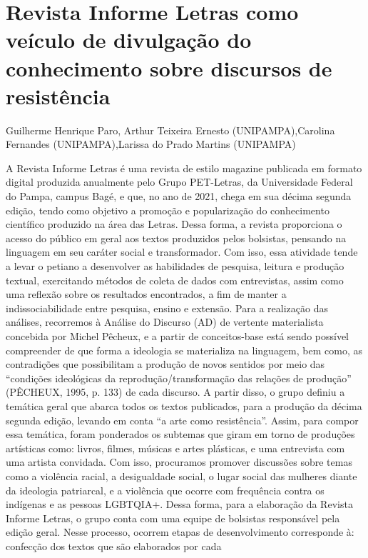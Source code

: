 

\section{Revista Informe Letras como veículo de divulgação do conhecimento sobre discursos de resistência}

Guilherme Henrique Paro, Arthur Teixeira Ernesto (UNIPAMPA),Carolina Fernandes (UNIPAMPA),Larissa do Prado Martins (UNIPAMPA)

A Revista Informe Letras é uma revista de estilo magazine publicada em formato digital
produzida anualmente pelo Grupo PET-Letras, da Universidade Federal do Pampa, campus
Bagé, e que, no ano de 2021, chega em sua décima segunda edição, tendo como objetivo a
promoção e popularização do conhecimento científico produzido na área das Letras. Dessa
forma, a revista proporciona o acesso do público em geral aos textos produzidos pelos bolsistas,
pensando na linguagem em seu caráter social e transformador. Com isso, essa atividade tende a
levar o petiano a desenvolver as habilidades de pesquisa, leitura e produção textual, exercitando
métodos de coleta de dados com entrevistas, assim como uma reflexão sobre os resultados
encontrados, a fim de manter a indissociabilidade entre pesquisa, ensino e extensão. Para a
realização das análises, recorremos à Análise do Discurso (AD) de vertente materialista
concebida por Michel Pêcheux, e a partir de conceitos-base está sendo possível compreender de
que forma a ideologia se materializa na linguagem, bem como, as contradições que possibilitam
a produção de novos sentidos por meio das “condições ideológicas da reprodução/transformação
das relações de produção” (PÊCHEUX, 1995, p. 133) de cada discurso. A partir disso, o grupo
definiu a temática geral que abarca todos os textos publicados, para a produção da décima
segunda edição, levando em conta “a arte como resistência”. Assim, para compor essa temática,
foram ponderados os subtemas que giram em torno de produções artísticas como: livros, filmes,
músicas e artes plásticas, e uma entrevista com uma artista convidada. Com isso, procuramos
promover discussões sobre temas como a violência racial, a desigualdade social, o lugar social
das mulheres diante da ideologia patriarcal, e a violência que ocorre com frequência contra os
indígenas e as pessoas LGBTQIA+. Dessa forma, para a elaboração da Revista Informe Letras, o
grupo conta com uma equipe de bolsistas responsável pela edição geral. Nesse processo, ocorrem
etapas de desenvolvimento corresponde à: confecção dos textos que são elaborados por cada
